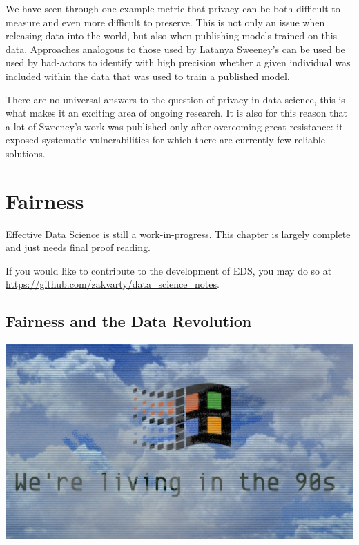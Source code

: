 \documentclass[
  12pt,
]{book}
\begin{document}
We have seen through one example metric that privacy can be both difficult to measure and even more difficult to preserve. This is not only an issue when releasing data into the world, but also when publishing models trained on this data. Approaches analogous to those used by Latanya Sweeney's can be used be used by bad-actors to identify with high precision whether a given individual was included within the data that was used to train a published model.

There are no universal answers to the question of privacy in data science, this is what makes it an exciting area of ongoing research. It is also for this reason that a lot of Sweeney's work was published only after overcoming great resistance: it exposed systematic vulnerabilities for which there are currently few reliable solutions.

\hypertarget{ethics-fairness}{%
\chapter{Fairness}\label{ethics-fairness}}

Effective Data Science is still a work-in-progress. This chapter is largely complete and just needs final proof reading.

If you would like to contribute to the development of EDS, you may do so at \url{https://github.com/zakvarty/data_science_notes}.

\hypertarget{fairness-and-the-data-revolution}{%
\section{Fairness and the Data Revolution}\label{fairness-and-the-data-revolution}}

\begin{center}\includegraphics[width=1\linewidth]{images/502-ethics-fairness/90s-windows-wallpaper} \end{center}
\end{document}
